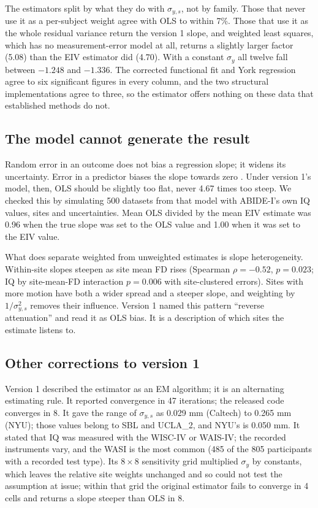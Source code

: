\documentclass[11pt,a4paper]{article}
\newcommand{\sy}{\sigma_{y}}
\begin{document}
The estimators split by what they do with $\sigma_{y,s}$, not by family. Those that never use it as a per-subject weight agree with OLS to within 7\%. Those that use it as the whole residual variance return the version 1 slope, and weighted least squares, which has no measurement-error model at all, returns a slightly larger factor (5.08) than the EIV estimator did (4.70). With a constant $\sy$ all twelve fall between $-1.248$ and $-1.336$. The corrected functional fit and York regression agree to six significant figures in every column, and the two structural implementations agree to three, so the estimator offers nothing on these data that established methods do not.

\subsection{The model cannot generate the result}

Random error in an outcome does not bias a regression slope; it widens its uncertainty. Error in a predictor biases the slope towards zero \citep{Fuller1987, Carroll2006}. Under version 1's model, then, OLS should be slightly too flat, never 4.67 times too steep. We checked this by simulating 500 datasets from that model with ABIDE-I's own IQ values, sites and uncertainties. Mean OLS divided by the mean EIV estimate was 0.96 when the true slope was set to the OLS value and 1.00 when it was set to the EIV value.

What does separate weighted from unweighted estimates is slope heterogeneity. Within-site slopes steepen as site mean FD rises (Spearman $\rho = -0.52$, $p = 0.023$; IQ by site-mean-FD interaction $p = 0.006$ with site-clustered errors). Sites with more motion have both a wider spread and a steeper slope, and weighting by $1/\sigma_{y,s}^2$ removes their influence. Version 1 named this pattern ``reverse attenuation'' and read it as OLS bias. It is a description of which sites the estimate listens to.

\subsection{Other corrections to version 1}

Version 1 described the estimator as an EM algorithm; it is an alternating estimating rule. It reported convergence in 47 iterations; the released code converges in 8. It gave the range of $\sigma_{y,s}$ as 0.029 mm (Caltech) to 0.265 mm (NYU); those values belong to SBL and UCLA\_2, and NYU's is 0.050 mm. It stated that IQ was measured with the WISC-IV or WAIS-IV; the recorded instruments vary, and the WASI is the most common (485 of the 805 participants with a recorded test type). Its $8 \times 8$ sensitivity grid multiplied $\sy$ by constants, which leaves the relative site weights unchanged and so could not test the assumption at issue; within that grid the original estimator fails to converge in 4 cells and returns a slope steeper than OLS in 8.
\end{document}
